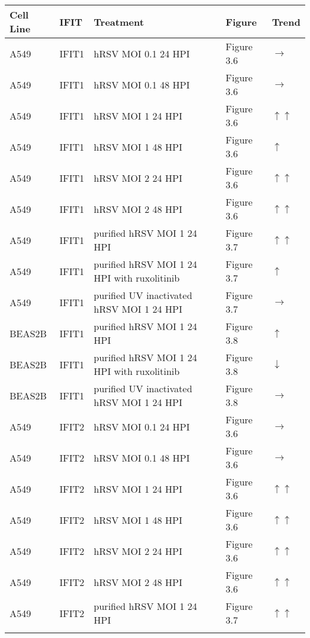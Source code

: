 \begin{table}
    \centering
    \begin{tabular}{lllll}
    \hline
        \textbf{Cell Line} & \textbf{IFIT} & \textbf{Treatment} & \textbf{Figure} & \textbf{Trend} \\ \hline
        A549 & IFIT1 & hRSV MOI 0.1 24 HPI & Figure 3.6 & $\rightarrow$ \\ 
        A549 & IFIT1 & hRSV MOI 0.1 48 HPI & Figure 3.6 & $\rightarrow$ \\ 
        A549 & IFIT1 & hRSV MOI 1 24 HPI & Figure 3.6 & $\uparrow$$\uparrow$ \\ 
        A549 & IFIT1 & hRSV MOI 1 48 HPI & Figure 3.6 & $\uparrow$ \\ 
        A549 & IFIT1 & hRSV MOI 2 24 HPI & Figure 3.6 & $\uparrow$$\uparrow$ \\ 
        A549 & IFIT1 & hRSV MOI 2 48 HPI & Figure 3.6 & $\uparrow$$\uparrow$ \\ 
        A549 & IFIT1 & purified hRSV MOI 1 24 HPI & Figure 3.7 & $\uparrow$$\uparrow$ \\ 
        A549 & IFIT1 & purified hRSV MOI 1 24 HPI with ruxolitinib & Figure 3.7 & $\uparrow$ \\ 
        A549 & IFIT1 & purified UV inactivated hRSV MOI 1 24 HPI & Figure 3.7 & $\rightarrow$ \\ 
        BEAS2B & IFIT1 & purified hRSV MOI 1 24 HPI & Figure 3.8 & $\uparrow$ \\ 
        BEAS2B & IFIT1 & purified hRSV MOI 1 24 HPI with ruxolitinib & Figure 3.8 & $\downarrow$ \\ 
        BEAS2B & IFIT1 & purified UV inactivated hRSV MOI 1 24 HPI & Figure 3.8 & $\rightarrow$ \\ 
        A549 & IFIT2 & hRSV MOI 0.1 24 HPI & Figure 3.6 & $\rightarrow$ \\ 
        A549 & IFIT2 & hRSV MOI 0.1 48 HPI & Figure 3.6 & $\rightarrow$ \\ 
        A549 & IFIT2 & hRSV MOI 1 24 HPI & Figure 3.6 & $\uparrow$$\uparrow$ \\ 
        A549 & IFIT2 & hRSV MOI 1 48 HPI & Figure 3.6 & $\uparrow$$\uparrow$ \\ 
        A549 & IFIT2 & hRSV MOI 2 24 HPI & Figure 3.6 & $\uparrow$$\uparrow$ \\ 
        A549 & IFIT2 & hRSV MOI 2 48 HPI & Figure 3.6 & $\uparrow$$\uparrow$ \\ 
        A549 & IFIT2 & purified hRSV MOI 1 24 HPI & Figure 3.7 & $\uparrow$$\uparrow$ \\ 
$$
\end{tabular}
\end{table}
